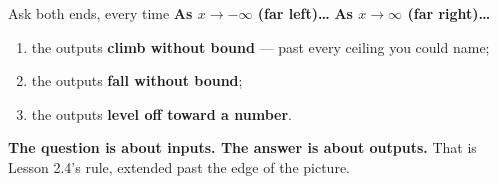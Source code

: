 \documentclass[aspectratio=169, 11pt]{beamer}
\begin{document}
\begin{frame}[t, plain]
  \begin{block}{Ask both ends, every time}
    \centering
    \textbf{As $x \to -\infty$ (far left)\dots} \qquad\qquad \textbf{As $x \to \infty$ (far
    right)\dots}
  \end{block}
  \begin{enumerate}
    \setlength{\itemsep}{0.3cm}
    \item the outputs \textbf{climb without bound} --- past every ceiling you could name;
    \item the outputs \textbf{fall without bound};
    \item the outputs \textbf{level off toward a number}.
  \end{enumerate}
  \vspace{0.15cm}
  \textbf{The question is about inputs. The answer is about outputs.} That is Lesson 2.4's rule,
  extended past the edge of the picture.
\end{frame}
\end{document}
